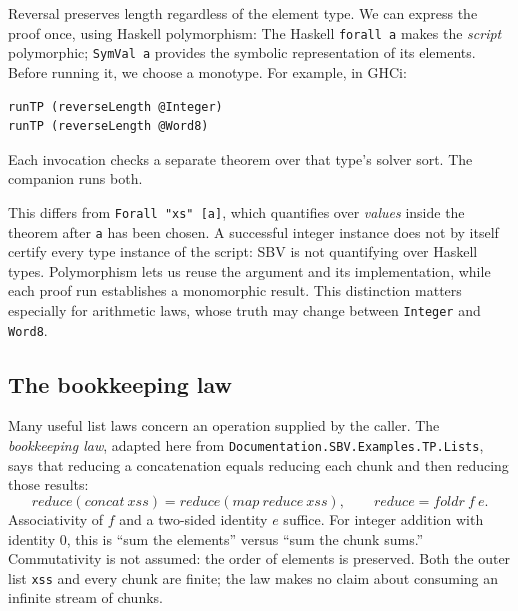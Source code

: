 \documentclass[acmsmall,screen,review,anonymous,nonacm]{acmart}
\newcommand{\code}[1]{\texttt{#1}}
\begin{document}
Reversal preserves length regardless of the element type. We can express the
proof once, using Haskell polymorphism:
The Haskell \code{forall a} makes the \emph{script} polymorphic; \code{SymVal a}
provides the symbolic representation of its elements. Before running it, we
choose a monotype. For example, in GHCi:
\begin{lstlisting}
runTP (reverseLength @Integer)
runTP (reverseLength @Word8)
\end{lstlisting}
Each invocation checks a separate theorem over that type's solver sort. The
companion runs both.

This differs from \code{Forall "xs" [a]}, which quantifies over \emph{values}
inside the theorem after \code{a} has been chosen. A successful integer instance
does not by itself certify every type instance of the script: SBV is not
quantifying over Haskell types. Polymorphism lets us reuse the argument and its
implementation, while each proof run establishes a monomorphic result. This
distinction matters especially for arithmetic laws, whose truth may change
between \code{Integer} and \code{Word8}.

\subsection{The bookkeeping law}

Many useful list laws concern an operation supplied by the caller. The
\emph{bookkeeping law}, adapted here from
\code{Documentation.SBV.Examples.TP.Lists}, says that reducing a concatenation
equals reducing each chunk and then reducing those results:
\[
 \mathit{reduce}(\mathit{concat}\ xss)
 = \mathit{reduce}(\mathit{map}\ \mathit{reduce}\ xss),
 \qquad \mathit{reduce}=\mathit{foldr}\ f\ e.
\]
Associativity of $f$ and a two-sided identity $e$ suffice. For integer addition
with identity 0, this is ``sum the elements'' versus ``sum the chunk sums.''
Commutativity is not assumed: the order of elements is preserved.
Both the outer list \code{xss} and every chunk are finite; the law makes no
claim about consuming an infinite stream of chunks.
\end{document}
